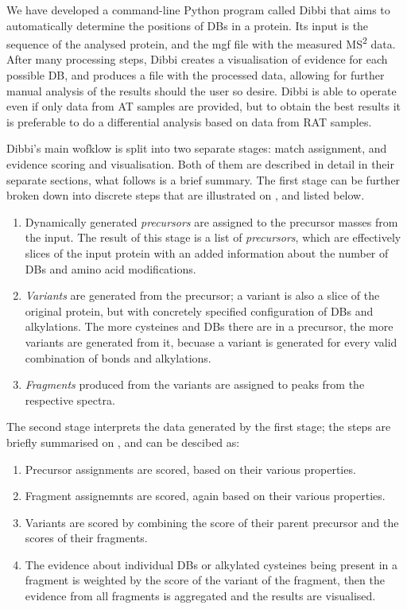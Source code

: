 We have developed a command-line Python program called Dibbi that aims to automatically determine the positions of DBs in a protein. Its input is the sequence of the analysed protein, and the mgf file with the measured MS\textsuperscript{2} data. After many processing steps, Dibbi creates a visualisation of evidence for each possible DB, and produces a file with the processed data, allowing for further manual analysis of the results should the user so desire. Dibbi is able to operate even if only data from AT samples are provided, but to obtain the best results it is preferable to do a differential analysis based on data from RAT samples.

Dibbi's main wofklow is split into two separate stages: match assignment, and evidence scoring and visualisation. Both of them are described in detail in their separate sections, what follows is a brief summary. The first stage can be further broken down into discrete steps that are illustrated on , and listed below.

\begin{enumerate}
	\item Dynamically generated \emph{precursors} are assigned to the precursor masses from the input. The result of this stage is a list of \emph{precursors}, which are effectively slices of the input protein with an added information about the number of DBs and amino acid modifications.
	\item \emph{Variants} are generated from the precursor; a variant is also a slice of the original protein, but with concretely specified configuration of DBs and alkylations. The more cysteines and DBs there are in a precursor, the more variants are generated from it, becuase a variant is generated for every valid combination of bonds and alkylations.
	\item \emph{Fragments} produced from the variants are assigned to peaks from the respective spectra.
\end{enumerate}

The second stage interprets the data generated by the first stage; the steps are briefly summarised on , and can be descibed as:

\begin{enumerate}
	\item Precursor assignments are scored, based on their various properties.
	\item Fragment assignemnts are scored, again based on their various properties.
	\item Variants are scored by combining the score of their parent precursor and the scores of their fragments.
	\item The evidence about individual DBs or alkylated cysteines being present in a fragment is weighted by the score of the variant of the fragment, then the evidence from all fragments is aggregated and the results are visualised.
\end{enumerate}


